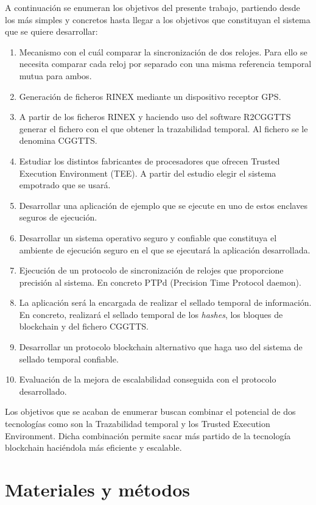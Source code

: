 A continuación se enumeran los objetivos del presente trabajo, partiendo desde los más simples y concretos hasta llegar a los objetivos que constituyan el sistema que se quiere desarrollar:

\begin{enumerate}
	\item Mecanismo con el cuál comparar la sincronización de dos relojes. Para ello se necesita comparar cada reloj por separado con una misma referencia temporal mutua para ambos.
	\item Generación de ficheros RINEX mediante un dispositivo receptor GPS.
	\item A partir de los ficheros RINEX y haciendo uso del software R2CGGTTS generar el fichero con el que obtener la trazabilidad temporal. Al fichero se le denomina CGGTTS.
	\item Estudiar los distintos fabricantes de procesadores que ofrecen Trusted Execution Environment (TEE). A partir del estudio elegir el sistema empotrado que se usará.
	\item Desarrollar una aplicación de ejemplo que se ejecute en uno de estos enclaves seguros de ejecución.
	\item Desarrollar un sistema operativo seguro y confiable que constituya el ambiente de ejecución seguro en el que se ejecutará la aplicación desarrollada.
	\item Ejecución de un protocolo de sincronización de relojes que proporcione precisión al sistema. En concreto PTPd (Precision Time Protocol daemon).
	\item La aplicación será la encargada de realizar el sellado temporal de información. En concreto, realizará el sellado temporal de los \textit{hashes}, los bloques de blockchain y del fichero CGGTTS.
	\item Desarrollar un protocolo blockchain alternativo que haga uso del sistema de sellado temporal confiable.
	\item Evaluación de la mejora de escalabilidad conseguida con el protocolo desarrollado.
\end{enumerate}

Los objetivos que se acaban de enumerar buscan combinar el potencial de dos tecnologías como son la Trazabilidad temporal y los Trusted Execution Environment. Dicha combinación permite sacar más partido de la tecnología blockchain haciéndola más eficiente y escalable.

\section{Materiales y métodos}


